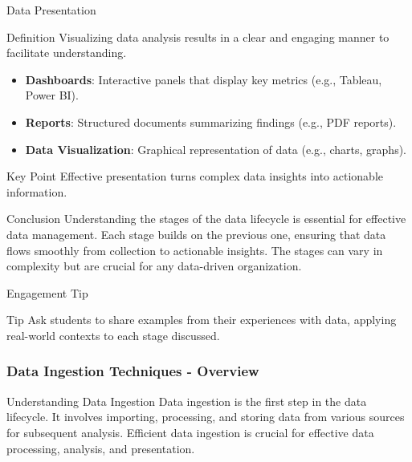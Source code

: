 \documentclass[aspectratio=169]{beamer}
\begin{document}
\begin{frame}[fragile]{Data Presentation}
    \begin{block}{Definition}
        Visualizing data analysis results in a clear and engaging manner to facilitate understanding.
    \end{block}
    \begin{itemize}
        \item \textbf{Dashboards}: Interactive panels that display key metrics (e.g., Tableau, Power BI).
        \item \textbf{Reports}: Structured documents summarizing findings (e.g., PDF reports).
        \item \textbf{Data Visualization}: Graphical representation of data (e.g., charts, graphs).
    \end{itemize}
    \begin{block}{Key Point}
        Effective presentation turns complex data insights into actionable information.
    \end{block}
\end{frame}

\begin{frame}[fragile]{Conclusion}
    Understanding the stages of the data lifecycle is essential for effective data management. Each stage builds on the previous one, ensuring that data flows smoothly from collection to actionable insights. The stages can vary in complexity but are crucial for any data-driven organization.
\end{frame}

\begin{frame}[fragile]{Engagement Tip}
    \begin{block}{Tip}
        Ask students to share examples from their experiences with data, applying real-world contexts to each stage discussed.
    \end{block}
\end{frame}

\begin{frame}[fragile]
    \frametitle{Data Ingestion Techniques - Overview}
    \begin{block}{Understanding Data Ingestion}
        Data ingestion is the first step in the data lifecycle. It involves importing, processing, and storing data from various sources for subsequent analysis. Efficient data ingestion is crucial for effective data processing, analysis, and presentation.
    \end{block}
\end{frame}
\end{document}
